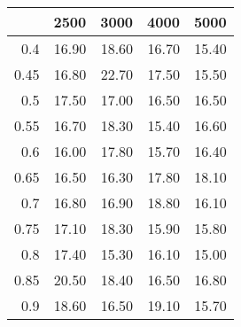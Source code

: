 \begin{table}[ht]
\centering
\begin{tabular}{rrrrr}
  \hline
 & 2500 & 3000 & 4000 & 5000 \\ 
  \hline
0.4 & 16.90 & 18.60 & 16.70 & 15.40 \\ 
  0.45 & 16.80 & 22.70 & 17.50 & 15.50 \\ 
  0.5 & 17.50 & 17.00 & 16.50 & 16.50 \\ 
  0.55 & 16.70 & 18.30 & 15.40 & 16.60 \\ 
  0.6 & 16.00 & 17.80 & 15.70 & 16.40 \\ 
  0.65 & 16.50 & 16.30 & 17.80 & 18.10 \\ 
  0.7 & 16.80 & 16.90 & 18.80 & 16.10 \\ 
  0.75 & 17.10 & 18.30 & 15.90 & 15.80 \\ 
  0.8 & 17.40 & 15.30 & 16.10 & 15.00 \\ 
  0.85 & 20.50 & 18.40 & 16.50 & 16.80 \\ 
  0.9 & 18.60 & 16.50 & 19.10 & 15.70 \\ 
   \hline
\end{tabular}
\end{table}
